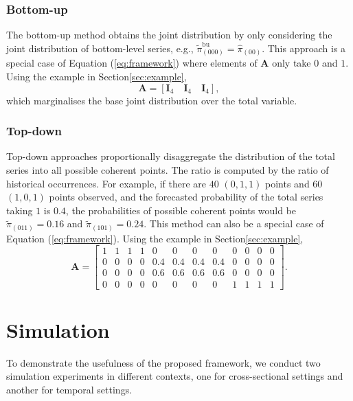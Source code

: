 \documentclass[a4paper,review,12pt,authoryear]{elsarticle}
\begin{document}
    \subsubsection*{Bottom-up}
    \label{sec:bottomup}
    The bottom-up method obtains the joint distribution by only considering the joint distribution of bottom-level series, e.g., $\tilde\pi^{\text{bu}}_{(000)} = \hat\pi_{(00)}$. 
    This approach is a special case of Equation (\ref{eq:framework}) where elements of $\mathbf{A}$ only take $0$ and $1$. 
    Using the example in Section\ref{sec:example},
    \[
    \mathbf{A} = [\mathbf{I}_4\quad \mathbf{I}_4 \quad \mathbf{I}_4 ],
  \]
    which marginalises the base joint distribution over the total variable.

    \subsubsection*{Top-down}

    Top-down approaches proportionally disaggregate the distribution of the total series into all possible coherent points. 
    The ratio is computed by the ratio of historical occurrences.
    For example, if there are $40$ $(0, 1, 1)$ points and $60$ $(1, 0, 1) $ points observed, and the forecasted probability of the total series taking $1$ is $0.4$, the probabilities of possible coherent points would be $\tilde \pi_{(011)} = 0.16$ and $\tilde \pi_{(101)} = 0.24$.
    This method can also be a special case of Equation (\ref{eq:framework}).
    Using the example in Section\ref{sec:example},
    \[
    \mathbf{A} = \left[\begin{matrix}
      1 & 1 & 1 & 1 & 0 & 0 & 0 & 0 & 0 & 0 & 0 & 0 \\
      0 & 0 & 0 & 0 & 0.4 & 0.4 & 0.4 & 0.4 & 0 & 0 & 0 & 0 \\      
      0 & 0 & 0 & 0 & 0.6 & 0.6 & 0.6 & 0.6 & 0 & 0 & 0 & 0 \\
      0 & 0 & 0 & 0 & 0 & 0 & 0 & 0 & 1 & 1 & 1 & 1  
    \end{matrix}\right].
    \]

     \section{Simulation}
     \label{sec:simulation}
     To demonstrate the usefulness of the proposed framework, we conduct two simulation experiments in different contexts, one for cross-sectional settings and another for temporal settings. 
     
\end{document}
